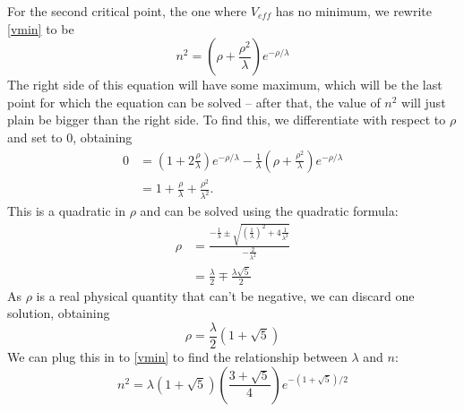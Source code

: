 \documentclass{article}
\newcommand{\expo}{e^{-\rho/\lambda}}
\begin{document}
For the second critical point, the one where $V_{eff}$ has no minimum, we rewrite \eqref{vmin} to be
\begin{equation}
n^2 = \left( \rho + \frac{\rho^2}{\lambda} \right) e^{-\rho/\lambda}
\end{equation}
The right side of this equation will have some maximum, which will be the last point for which the equation can be solved -- after that, the value of $n^2$ will just plain be bigger than the right side. To find this, we differentiate with respect to $\rho$ and set to 0, obtaining
\begin{align}
0 &= (1+2\frac{\rho}{\lambda})\expo - \frac{1}{\lambda}(\rho + \frac{\rho^2}{\lambda})\expo \\
&= 1 + \frac{\rho}{\lambda} + \frac{\rho^2}{\lambda^2}\mbox{.}
\end{align}
This is a quadratic in $\rho$ and can be solved using the quadratic formula:
\begin{align}
\rho &= \frac{-\frac{1}{\lambda} \pm \sqrt{\left(\frac{1}{\lambda}\right)^2+4\frac{1}{\lambda^2}}}{-\frac{2}{\lambda^2}} \\
&= \frac{\lambda}{2} \mp \frac{\lambda \sqrt{5}}{2}
\end{align}
As $\rho$ is a real physical quantity that can't be negative, we can discard one solution, obtaining
\begin{equation}
\rho = \frac{\lambda}{2}(1+\sqrt{5})
\end{equation}
We can plug this in to \eqref{vmin} to find the relationship between $\lambda$ and $n$:
\begin{equation}
n^2 = \lambda(1+\sqrt{5})\left(\frac{3+\sqrt{5}}{4}\right)e^{-(1+\sqrt{5})/2}
\end{equation}
\end{document}
